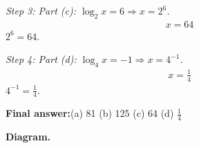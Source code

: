 \documentclass[11pt]{article}
\begin{document}
\textit{Step 3: Part (c): \( \log_2 x = 6 \Rightarrow x = 2^6 \).}
\[\begin{gathered}
x = 64
\end{gathered}\]
\( 2^6 = 64 \).

\textit{Step 4: Part (d): \( \log_4 x = -1 \Rightarrow x = 4^{-1} \).}
\[\begin{gathered}
x = \frac{1}{4}
\end{gathered}\]
\( 4^{-1} = \frac{1}{4} \).

\begin{answerbox}
\textbf{Final answer:}\quad (a) 81 \quad  (b) 125 \quad  (c) 64 \quad  (d) \(\displaystyle  \frac{1}{4} \)
\end{answerbox}
\textbf{Diagram.}

\begin{center}
\end{center}
\end{document}
